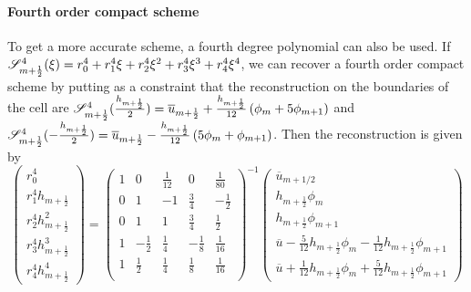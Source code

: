 \paragraph{Fourth order compact scheme}
To get a more accurate scheme,
a fourth degree polynomial can also be used. If
${\cal S}_{m+\frac{1}{2}}^4(\xi) = r_0^4 + r_1^4 \xi + r_2^4 \xi^2 
+ r_3^4 \xi^3 + r_4^4 \xi^4$, we can recover a fourth order compact
scheme by putting as a constraint that the reconstruction
on the boundaries of the cell are
${\cal S}^4_{m+\frac{1}{2}}(\frac{h_{m+\frac{1}{2}}}{2}) =
\overline{u}_{m+\frac{1}{2}} + \frac{h_{m+\frac{1}{2}}}{12}\left(
\phi_m + 5\phi_{m+1}\right) $ and
${\cal S}^4_{m+\frac{1}{2}}(-\frac{h_{m+\frac{1}{2}}}{2}) =
\overline{u}_{m+\frac{1}{2}} - \frac{h_{m+\frac{1}{2}}}{12}\left(
5\phi_m + \phi_{m+1}\right)$.
Then the reconstruction is given by
\begin{equation}
    \begin{pmatrix}
    r_0^4 \\
    r_1^4 h_{m+\frac{1}{2}} \\
    r_2^4 h_{m+\frac{1}{2}}^2 \\
    r_3^4 h_{m+\frac{1}{2}}^3 \\
    r_4^4 h_{m+\frac{1}{2}}^4
    \end{pmatrix}
     = 
    \begin{pmatrix}
    1 & 0 & \frac{1}{12} & 0 & \frac{1}{80} \\
    0 & 1 & -1 & \frac{3}{4} & -\frac{1}{2} \\
    0 & 1 & 1 & \frac{3}{4} & \frac{1}{2} \\
    1 & -\frac{1}{2} & \frac{1}{4} & -\frac{1}{8}
    & \frac{1}{16} \\
    1 & \frac{1}{2} & \frac{1}{4} & \frac{1}{8}
    & \frac{1}{16} \\
    \end{pmatrix}^{-1}
    \begin{pmatrix}
    \overline{u}_{m+1/2} \\
    h_{m+\frac{1}{2}} \phi_m \\
	    h_{m+\frac{1}{2}} \phi_{m+1} \\
	    \overline{u} - \frac{5}{12} h_{m+\frac{1}{2}} \phi_m - \frac{1}{12} h_{m+\frac{1}{2}} \phi_{m+1} \\
	    \overline{u} + \frac{1}{12} h_{m+\frac{1}{2}} \phi_m + \frac{5}{12} h_{m+\frac{1}{2}} \phi_{m+1}
    \end{pmatrix}
\end{equation}

